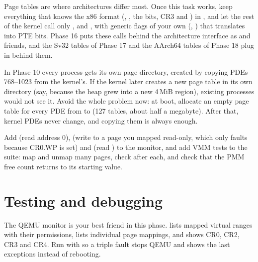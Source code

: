 \documentclass[11pt,a4paper]{article}
\begin{document}
\begin{tipbox}
Page tables are where architectures differ most. Once this task works, keep everything that knows the x86 format
(, , the  bits, CR3 and ) in , and let
the rest of the kernel call only ,  and , with generic flags of
your own (, ) that  translates into PTE bits. Phase 16 puts these calls
behind the architecture interface as  and friends, and the Sv32 tables of Phase 17 and the AArch64
tables of Phase 18 plug in behind them.
\end{tipbox}

In Phase 10 every process gets its own page directory, created by copying PDEs 768--1023 from the kernel's. If the
kernel later creates a new page table in its own directory (say, because the heap grew into a new 4\,MiB region),
existing processes would not see it. Avoid the whole problem now: at boot, allocate an empty page table for every PDE
from  to  (127 tables, about half a megabyte). After that, kernel PDEs never change,
and copying them is always enough.

Add  (read address 0),  (write to a page you mapped read-only, which only faults
because CR0.WP is set) and  (read ) to the monitor, and add VMM tests to the
suite: map and unmap many pages, check  after each, and check that the PMM free count returns to
its starting value.

\section{Testing and debugging}

The QEMU monitor is your best friend in this phase.  lists mapped virtual ranges with their
permissions,  lists individual page mappings, and  shows CR0, CR2, CR3 and CR4.
Run with  so a triple fault stops QEMU and shows the last exceptions instead of
rebooting.
\end{document}
